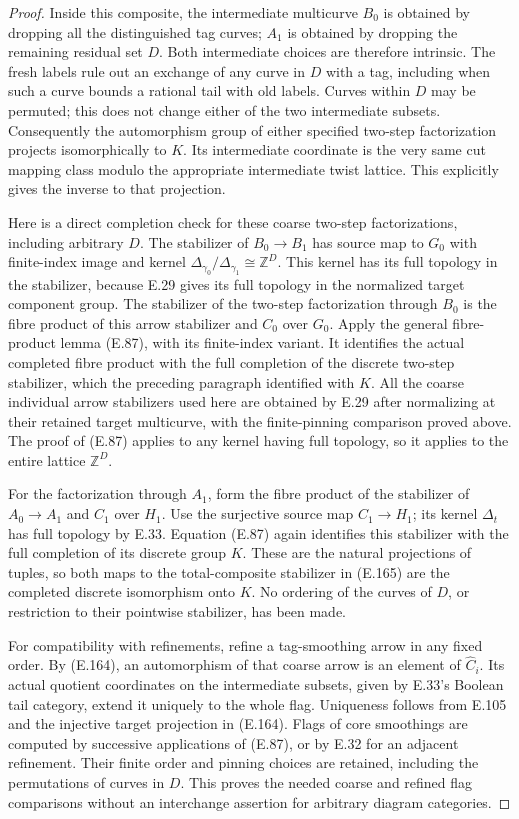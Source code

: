 \begin{proof}
Inside this composite, the intermediate multicurve $B_0$ is
obtained by dropping all the distinguished tag curves; $A_1$ is
obtained by dropping the remaining residual set $D$.
Both intermediate choices are therefore intrinsic.  The fresh
labels rule out an exchange of any curve in $D$ with a tag,
including when such a curve bounds a rational tail with old
labels.  Curves within $D$ may be permuted; this does not
change either of the two intermediate subsets.  Consequently
the automorphism group of either specified two-step
factorization projects isomorphically to $K$.  Its intermediate
coordinate is the very same cut mapping class modulo the
appropriate intermediate twist lattice.  This explicitly gives
the inverse to that projection.

Here is a direct completion check for these coarse two-step
factorizations, including arbitrary $D$.  The stabilizer of
$B_0\to B_1$ has source map to $G_0$ with finite-index image
and kernel
$\Delta_{\gamma_0}/\Delta_{\gamma_1}\cong\mathbb Z^D$.
This kernel has its full topology in the stabilizer, because
E.29 gives its full topology in the normalized target component
group.  The stabilizer of the two-step factorization through
$B_0$ is the fibre product of this arrow stabilizer and $C_0$
over $G_0$.  Apply the general fibre-product lemma (E.87),
with its finite-index variant.  It identifies the actual
completed fibre product with the full completion of the
discrete two-step stabilizer, which the preceding paragraph
identified with $K$.  All the coarse individual arrow
stabilizers used here are obtained by E.29 after normalizing
at their retained target multicurve, with the finite-pinning
comparison proved above.  The proof of (E.87) applies to any
kernel having full topology, so it applies to the entire
lattice $\mathbb Z^D$.

For the factorization through $A_1$, form the fibre product
of the stabilizer of $A_0\to A_1$ and $C_1$ over $H_1$.
Use the surjective source map $C_1\to H_1$; its kernel
$\Delta_t$ has full topology by E.33.  Equation (E.87) again
identifies this stabilizer with the full completion of its
discrete group $K$.  These are the natural projections of
tuples, so both maps to the total-composite stabilizer in
(E.165) are the completed discrete isomorphism onto $K$.
No ordering of the curves of $D$, or restriction to their
pointwise stabilizer, has been made.

For compatibility with refinements, refine a tag-smoothing
arrow in any fixed order.  By (E.164), an automorphism of
that coarse arrow is an element of $\widehat C_i$.  Its
actual quotient coordinates on the intermediate subsets,
given by E.33's Boolean tail category, extend it uniquely
to the whole flag.  Uniqueness follows from E.105 and the
injective target projection in (E.164).  Flags of core
smoothings are computed by successive applications of
(E.87), or by E.32 for an adjacent refinement.  Their finite
order and pinning choices are retained, including the
permutations of curves in $D$.  This proves the needed
coarse and refined flag comparisons without an interchange
assertion for arbitrary diagram categories.


\end{proof}

